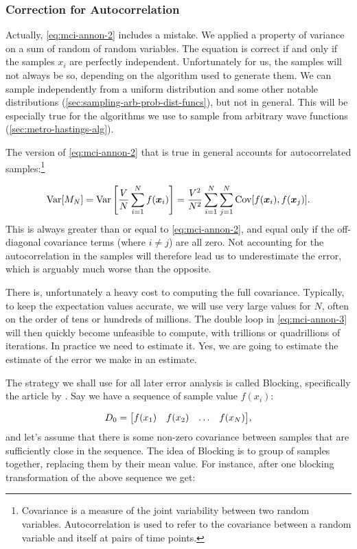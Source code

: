 \documentclass[Thesis.tex]{subfiles}
\begin{document}
\subsubsection{Correction for Autocorrelation}

Actually, \cref{eq:mci-annon-2} includes a mistake. We applied a property of
variance on a sum of random of random variables. The equation is correct if and
only if the samples $x_i$ are perfectly independent. Unfortunately for us,
the samples will not always be so, depending on the algorithm used to generate
them. We can sample independently from a uniform distribution and some other
notable distributions (\cref{sec:sampling-arb-prob-dist-funcs}), but not in
general. This will be especially true for the algorithms we use to sample from
arbitrary wave functions (\cref{sec:metro-hastings-alg}).

The version of \cref{eq:mci-annon-2} that is true in general accounts for
autocorrelated samples:\footnote{Covariance is a measure of the joint
  variability between two random variables. Autocorrelation is used to refer to
  the covariance between a random variable and itself at pairs of time points.}


\begin{align}
  \label{eq:mci-annon-3}
    \operatorname{Var}[M_N] = \operatorname{Var}\qty[ \frac{V}{N} \sum_{i=1}^Nf(\bm{x}_i)] = \frac{V^2}{N^2}\sum_{i=1}^N\sum_{j=1}^N\operatorname{Cov}[f(\bm{x}_i), f(\bm{x}_j)].
\end{align}
This is always greater than or equal to \cref{eq:mci-annon-2}, and equal only if
the off-diagonal covariance terms (where $i\neq j$) are all zero. Not accounting
for the autocorrelation in the samples will therefore lead us to underestimate
the error, which is arguably much worse than the opposite.

There is, unfortunately a heavy cost to computing the full covariance.
Typically, to keep the expectation values accurate, we will use very large
values for $N$, often on the order of tens or hundreds of millions. The double loop in
\cref{eq:mci-annon-3} will then quickly become unfeasible to compute, with
trillions or quadrillions of iterations. In practice we need to estimate it.
Yes, we are going to estimate the estimate of the error we make in an estimate. 

The strategy we shall use for all later error analysis is called Blocking,
specifically the article by \textcite{Jonsson-2018}. Say we have a sequence of
sample value $f(x_i)$:

\begin{align}
  D_0 = \mqty[f(x_1) & f(x_2) & \dots & f(x_N)],
\end{align}
and let's assume that there is some non-zero covariance between samples that are
sufficiently close in the sequence. The idea of Blocking is to group
 of samples together, replacing them by their mean value. For
instance, after one blocking transformation of the above sequence we get:
\end{document}
